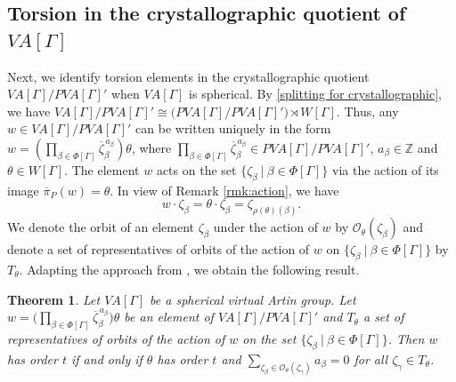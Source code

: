 \documentclass[12pt]{amsart}
\newtheorem{theorem}[equation]{Theorem}
\numberwithin{equation}{section}
\begin{document}
\subsection{Torsion in the crystallographic quotient of $VA[\Gamma]$}
Next, we identify torsion elements in the crystallographic quotient $VA[\Gamma] /PVA[\Gamma]'$ when $VA[\Gamma]$ is spherical. By \eqref{splitting for crystallographic}, we have $VA[\Gamma] /PVA[\Gamma]' \cong \big(PVA[\Gamma]/PVA[\Gamma]'\big) \rtimes W[\Gamma]$. Thus, any $w \in VA[\Gamma]/PVA[\Gamma]'$ can be written uniquely in the form $w= (\prod_{\beta \in \Phi[\Gamma]} \overline{\zeta}_{\beta}^{\,a_\beta})\theta$, where $\prod_{\beta \in \Phi[\Gamma]} \overline{\zeta}_{\beta}^{\, a_\beta} \in PVA[\Gamma] /PVA[\Gamma]'$, $a_\beta \in \mathbb Z$ and $\theta \in W[\Gamma]$. The element $w$ acts on the set $\{\zeta_\beta ~|~ \beta \in \Phi[\Gamma]\}$ via the action of its image $\overline{\pi}_P(w)=\theta$. In view of Remark \ref{rmk:action}, we have
$$w \cdot \zeta_\beta= \theta \cdot \zeta_\beta= \zeta_{\rho(\theta)(\beta)}.$$ We denote the orbit of an element $\zeta_\beta$ under the action of $w$  by $\mathcal{O}_\theta(\zeta_\beta)$ and denote a set of representatives of orbits of the action of  $w$ on $\{\zeta_\beta ~|~ \beta \in \Phi[\Gamma]\}$ by $T_\theta$.  Adapting the approach from \cite[Theorem 2.1]{MR4607569}, we obtain the following result.
\par

\begin{theorem}\label{crystallographic torsion}
Let $VA[\Gamma]$ be a spherical virtual Artin group.  Let $w= \big(\prod_{\beta \in \Phi[\Gamma]} \overline{\zeta}_{\beta}^{\,a_\beta} \big) \theta$ be an element of $VA[\Gamma]/PVA[\Gamma]'$ and $T_\theta$ a set of representatives of orbits of the action of  $w$ on the set $\{\zeta_\beta ~|~ \beta \in \Phi[\Gamma]\}$. Then $w$ has order $t$ if and only if $\theta$ has order $t$ and $\sum_{\zeta_\beta \in \mathcal{O}_\theta(\zeta_\gamma)} a_\beta=0$ for all $\zeta_\gamma \in T_\theta$.
\end{theorem}
\end{document}
